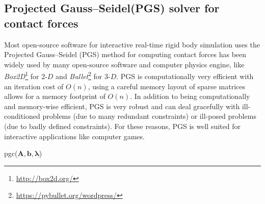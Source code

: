     \subsection{Projected Gauss–Seidel(PGS) solver for contact forces}
    Most open-source software for interactive real-time rigid body simulation uses the Projected Gauss–Seidel (PGS) method for computing contact forces has been widely used by many open-source software and computer physics engine, like \textit{Box2D}\footnote{\url{http://box2d.org/}} for 2-$D$ and \textit{Bullet}\footnote{\url{https://pybullet.org/wordpress/}} for 3-$D$. PGS is computationally very efficient with an iteration cost of $O(n)$, using a careful memory layout of sparse matrices allows for a memory footprint of $O(n)$. In addition to being computationally and memory-wise efficient, PGS is very robust and can deal gracefully with ill-conditioned problems (due to many redundant constraints) or ill-posed problems (due to badly defined constraints). For these reasons, PGS is well suited for interactive applications like computer games. 

    \begin{algorithm}[!h]
        \caption{pgc($\pmb{A}, \pmb{b}, \pmb{\lambda}$)}
    \end{algorithm}
